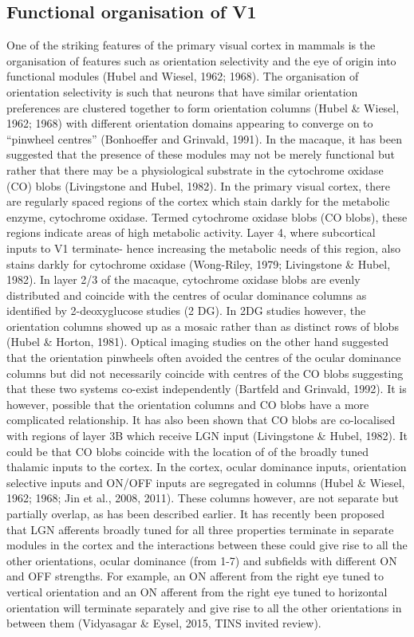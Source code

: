 	\subsection{Functional organisation of V1}
	One of the striking features of the primary visual cortex in mammals is the organisation of features such as orientation selectivity and the eye of origin into functional modules (Hubel and Wiesel, 1962; 1968). The organisation of orientation selectivity is such that neurons that have similar orientation preferences are clustered together to form orientation columns (Hubel \& Wiesel, 1962; 1968) with different orientation domains appearing to converge on to “pinwheel centres” (Bonhoeffer and Grinvald, 1991). In the macaque, it has been suggested that the presence of these modules may not be merely functional but rather that there may be a physiological substrate in the cytochrome oxidase (CO) blobs (Livingstone and Hubel, 1982).
	In the primary visual cortex, there are regularly spaced regions of the cortex which stain darkly for the metabolic enzyme, cytochrome oxidase. Termed cytochrome oxidase blobs (CO blobs), these regions indicate areas of high metabolic activity. Layer 4, where subcortical inputs to V1 terminate- hence increasing the metabolic needs of this region, also stains darkly for cytochrome oxidase (Wong-Riley, 1979; Livingstone \& Hubel, 1982). In layer 2/3 of the macaque, cytochrome oxidase blobs are evenly distributed and coincide with the centres of ocular dominance columns as identified by 2-deoxyglucose studies (2 DG). In 2DG studies however, the orientation columns showed up as a mosaic rather than as distinct rows of blobs (Hubel \& Horton, 1981). Optical imaging studies on the other hand suggested that the orientation pinwheels often avoided the centres of the ocular dominance columns but did not necessarily coincide with centres of the CO blobs suggesting that these two systems co-exist independently (Bartfeld and Grinvald, 1992). It is however, possible that the orientation columns and CO blobs have a more complicated relationship. It has also been shown that CO blobs are co-localised with regions of layer 3B which receive LGN input (Livingstone \& Hubel, 1982). It could be that CO blobs coincide with the location of of the broadly tuned thalamic inputs to the cortex. 
	In the cortex, ocular dominance inputs, orientation selective inputs and ON/OFF inputs are segregated in columns (Hubel \& Wiesel, 1962; 1968; Jin et al., 2008, 2011). These columns however, are not separate but partially overlap, as has been described earlier. It has recently been proposed that LGN afferents broadly tuned for all three properties terminate in separate modules in the cortex and the interactions between these could give rise to all the other orientations, ocular dominance (from 1-7) and subfields with different ON and OFF strengths. For example, an ON afferent from the right eye tuned to vertical orientation and an ON afferent from the right eye tuned to horizontal orientation will terminate separately and give rise to all the other orientations in between them (Vidyasagar \& Eysel, 2015, TINS invited review).

